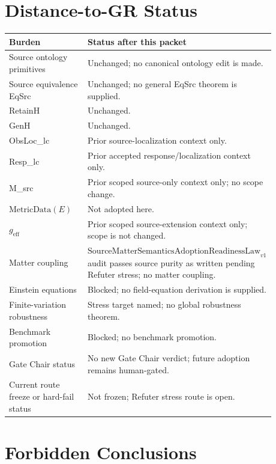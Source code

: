 \documentclass[11pt]{article}
\newcommand{\SMSAR}{\mathrm{SourceMatterSemanticsAdoptionReadinessLaw}_{v1}}
\newcommand{\MetricData}{\mathrm{MetricData}}
\newcommand{\geff}{g_{\mathrm{eff}}}
\begin{document}
\section{Distance-to-GR Status}

\begin{longtable}{p{0.30\linewidth}p{0.58\linewidth}}
\toprule
Burden & Status after this packet \\
\midrule
Source ontology primitives & Unchanged; no canonical ontology edit is made. \\
Source equivalence EqSrc & Unchanged; no general EqSrc theorem is supplied. \\
RetainH & Unchanged. \\
GenH & Unchanged. \\
ObsLoc\_lc & Prior source-localization context only. \\
Resp\_lc & Prior accepted response/localization context only. \\
M\_src & Prior scoped source-only context only; no scope change. \\
\(\MetricData(E)\) & Not adopted here. \\
\(\geff\) & Prior scoped source-extension context only; scope is not changed. \\
Matter coupling & \(\SMSAR\) audit passes source purity as written pending Refuter stress; no matter coupling. \\
Einstein equations & Blocked; no field-equation derivation is supplied. \\
Finite-variation robustness & Stress target named; no global robustness theorem. \\
Benchmark promotion & Blocked; no benchmark promotion. \\
Gate Chair status & No new Gate Chair verdict; future adoption remains human-gated. \\
Current route freeze or hard-fail status & Not frozen; Refuter stress route is open. \\
\bottomrule
\end{longtable}

\section{Forbidden Conclusions}
\end{document}
